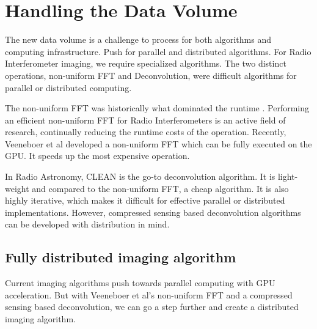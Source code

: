 \section{Handling the Data Volume}\label{volume}
The new data volume is a challenge to process for both algorithms and computing infrastructure. Push for parallel and distributed algorithms. For Radio Interferometer imaging, we require specialized algorithms. The two distinct operations, non-uniform FFT and Deconvolution, were difficult algorithms for parallel or distributed computing.

The non-uniform FFT was historically what dominated the runtime \cite{}. Performing an efficient non-uniform FFT for Radio Interferometers is an active field of research\cite{offringa2014wsclean, pratley2018fast}, continually reducing the runtime costs of the operation. Recently, Veeneboer et al\cite{veenboer2017image} developed a non-uniform FFT which can be fully executed on the GPU. It speeds up the most expensive operation.

In Radio Astronomy, CLEAN is the go-to deconvolution algorithm. It is light-weight and compared to the non-uniform FFT, a cheap algorithm. It is also highly iterative, which makes it difficult for effective parallel or distributed implementations. However, compressed sensing based deconvolution algorithms can be developed with distribution in mind.

\subsection{Fully distributed imaging algorithm}
Current imaging algorithms push towards parallel computing with GPU acceleration. But with Veeneboer et al's non-uniform FFT and a compressed sensing based deconvolution, we can go a step further and create a distributed imaging algorithm. 




